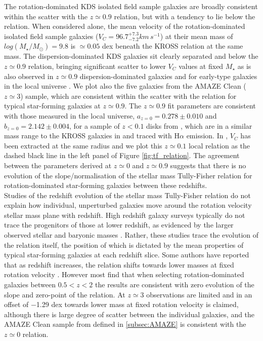 \documentclass[fleqn,usenatbib]{mnras}
\begin{document}
\noindent
The rotation-dominated KDS isolated field sample galaxies are broadly consistent within the scatter with the $z\simeq0.9$ relation, but with a tendency to lie below the relation.
When considered alone, the mean velocity of the rotation-dominated isolated field sample galaxies ($V_{C} = 96.7^{+7.3}_{-7.2}km\,s^{-1}$) at their mean mass of $log(M_{\star}/M_{\odot})=9.8$ is $\simeq0.05$ dex beneath the KROSS relation at the same mass.
The dispersion-dominated KDS galaxies sit clearly separated and below the $z\simeq0.9$ relation, bringing significant scatter to lower $V_{C}$ values at fixed $M_{\star}$ as is also observed in $z\simeq0.9$ dispersion-dominated galaxies and for early-type galaxies in the local universe \citep[e.g.][]{Romanowsky2012}. 
We plot also the five galaxies from the AMAZE Clean ($z\simeq3$) sample, which are consistent within the scatter with the relation for typical star-forming galaxies at $z\simeq0.9$.
The $z\simeq0.9$ fit parameters are consistent with those measured in the local universe, $a_{z=0} = 0.278 \pm 0.010$ and $b_{z=0} = 2.142 \pm 0.004$, for a sample of $z<0.1$ disks from \cite{Reyes2011}, which are in a similar mass range to the KROSS galaxies in \cite{Harrison2017} and traced with H$\alpha$ emission.
In \cite{Reyes2011}, $V_{C}$ has been extracted at the same radius and we plot this $z\simeq0.1$ local relation as the dashed black line in the left panel of Figure \ref{fig:tf_relation}.
The agreement between the parameters derived at $z\simeq0$ and $z\simeq0.9$ suggests that there is no evolution of the slope/normalisation of the stellar mass Tully-Fisher relation for rotation-dominated star-forming galaxies between these redshifts. \\

\noindent
Studies of the redshift evolution of the stellar mass Tully-Fisher relation do not explain how individual, unperturbed galaxies move around the rotation velocity stellar mass plane with redshift. 
High redshift galaxy surveys typically do not trace the progenitors of those at lower redshift, as evidenced by the larger observed stellar and baryonic masses \citep[e.g.][]{Cresci2009,Reyes2011,Wisnioski2015,Ubler2017}.
Rather, these studies trace the evolution of the relation itself, the position of which is dictated by the mean properties of typical star-forming galaxies at each redshift slice.
Some authors have reported that as redshift increases, the relation shifts towards lower masses at fixed rotation velocity \citep[e.g.][]{Puech2008,Cresci2009,Puech2010,Straatman2017,Ubler2017}.
However most find that when selecting rotation-dominated galaxies between $0.5 < z < 2$ \citep[e.g.][]{Flores2006,Miller2011,Kassin2012,Miller2012,Vergani2012,Miller2014,Contini2015a,DiTeodoro2016,Simons2016,Pelliccia2017,Molina2017,Harrison2017} the results are consistent with zero evolution of the slope and zero-point of the relation.
At $z\simeq3$ observations are limited and in \cite{Gnerucci2011} an offset of $-$1.29 dex towards lower mass at fixed rotation velocity is claimed, although there is large degree of scatter between the individual galaxies, and the AMAZE Clean sample from \cite{Gnerucci2011} defined in \cref{subsec:AMAZE} is consistent with the $z\simeq0$ relation. \\
\end{document}
